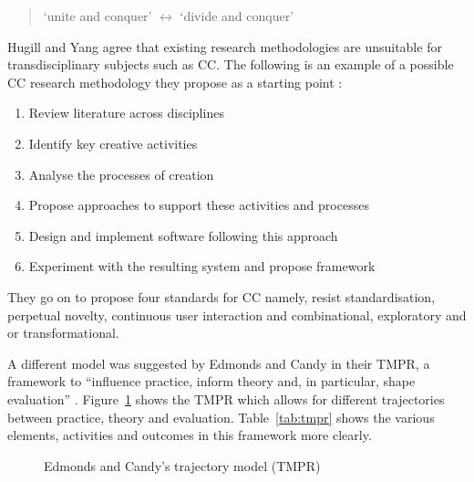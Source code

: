 \begin{quotation}
  `unite and conquer' $\longleftrightarrow$ `divide and conquer' 
\end{quotation}

Hugill and Yang agree that existing research methodologies are unsuitable for transdisciplinary subjects such as \ac{CC}. The following is an example of a possible \ac{CC} research methodology they propose as a starting point \autocite{Hugill2013c}:

\begin{enumerate}
  \item Review literature across disciplines
  \item Identify key creative activities
  \item Analyse the processes of creation
  \item Propose approaches to support these activities and processes
  \item Design and implement software following this approach
  \item Experiment with the resulting system and propose framework
\end{enumerate}

They go on to propose four standards for \ac{CC} \autocite{Hugill2013c} namely, resist standardisation, perpetual novelty, continuous user interaction and combinational, exploratory and or transformational.

A different model was suggested by Edmonds and Candy in their \ac{TMPR}, a framework to ``influence practice, inform theory and, in particular, shape evaluation'' \autocite*{Edmonds2010}. Figure~\ref{fig:tmpr} shows the \ac{TMPR} which allows for different trajectories between practice, theory and evaluation. Table~\ref{tab:tmpr} shows the various elements, activities and outcomes in this framework more clearly.

\begin{figure}[!htbp] %
  \centering
  \caption[Edmonds and Candy's trajectory model]{Edmonds and Candy's trajectory model (TMPR)}
\label{fig:tmpr}
\end{figure}

